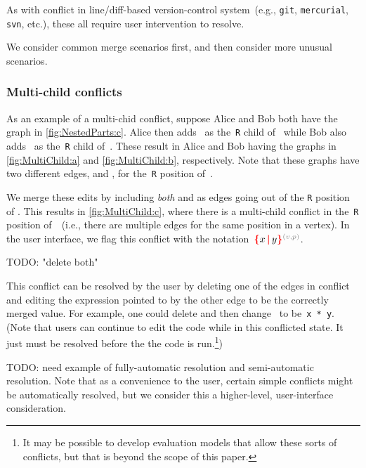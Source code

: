 As with conflict in line/diff-based version-control
system~(e.g., \texttt{git}, \texttt{mercurial}, \texttt{svn}, etc.),
these all require user intervention to resolve.

We consider common merge scenarios first, and then consider more unusual scenarios.

\subsubsection{Multi-child conflicts}%
\label{sub:Multi-child conflicts}

\figureMultiChild{}

As an example of a multi-chid conflict, suppose Alice and Bob both have the graph in \autoref{fig:NestedParts:c}.
Alice then adds~\vMultiChildAlice{} as the~\texttt{R} child of~\vWrapPlus{}
while Bob also adds~\vMultiChildBob{} as the~\texttt{R} child of~\vWrapPlus{}.
These result in Alice and Bob having the graphs in \autoref{fig:MultiChild:a} and \autoref{fig:MultiChild:b}, respectively.
Note that these graphs have two different edges, \eMultiChildAlice{} and \eMultiChildBob{}, for the~\texttt{R} position of~\vWrapPlus{}.

We merge these edits by including \emph{both} \eMultiChildAlice{} and \eMultiChildBob{}
as edges going out of the \texttt{R} position of \vWrapPlus{}.
This results in \autoref{fig:MultiChild:c}, where there is a multi-child conflict
in the~\texttt{R} position of~\vWrapPlus~(i.e., there are multiple edges for the same position in a vertex).
In the user interface, we flag this conflict with the notation~$\conflictHole{x,y}{v}{p}$.

TODO: "delete both"

This conflict can be resolved by the user by deleting
one of the edges in conflict and editing the expression pointed to by the other edge to be the correctly merged value.
For example, one could delete \eMultiChildBob{} and then change~\vMultiChildAlice{} to be~\texttt{x * y}.
(Note that users can continue to edit the code while in this conflicted state.
It just must be resolved before the the code is run.\footnote{It
  may be possible to develop evaluation models that allow these sorts of conflicts,
  but that is beyond the scope of this paper.})

TODO: need example of fully-automatic resolution and semi-automatic resolution.
Note that as a convenience to the user, certain simple
conflicts might be automatically resolved,
but we consider this a higher-level, user-interface consideration.

